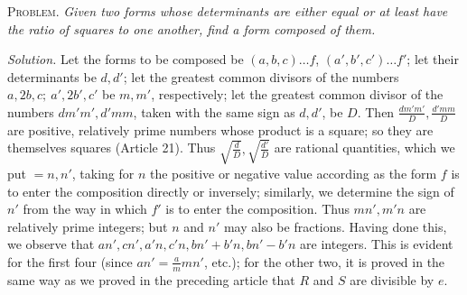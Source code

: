 \textsc{Problem.} \textit{Given two forms whose determinants are either equal or at least have the ratio of squares to one another, find a form composed of them.}

\textit{Solution.} Let the forms to be composed be $(a,b,c)\ldots f$, $(a',b',c')\ldots f'$; let their determinants be $d,d'$; let the greatest common divisors of the numbers $a,2b,c;\ a',2b',c'$ be $m,m'$, respectively; let the greatest common divisor of the numbers $dm'm',d'mm$, taken with the same sign as $d,d'$,
be $D$. Then $\frac{dm'm'}{D},\frac{d'mm}{D}$ are positive, relatively prime numbers whose product is a square; so they are themselves squares (Article 21). Thus $\sqrt{\frac{d}{D}},\sqrt{\frac{d'}{D}}$ are rational quantities, which we put $=n,n'$, taking for $n$ the positive or negative value according as the form $f$ is to enter the composition directly or inversely; similarly, we determine the sign of $n'$ from the way in which $f'$ is to enter the composition. Thus $mn',m'n$ are relatively prime integers; but $n$ and $n'$ may also be fractions. Having done this, we observe that $an',cn',a'n,c'n,bn'+b'n,bn'-b'n$ are integers. This is evident for the first four (since $an'=\frac{a}{m}mn'$, etc.); for the other two, it is proved in the same way as we proved in the preceding article that $R$ and $S$ are divisible by $e$.

